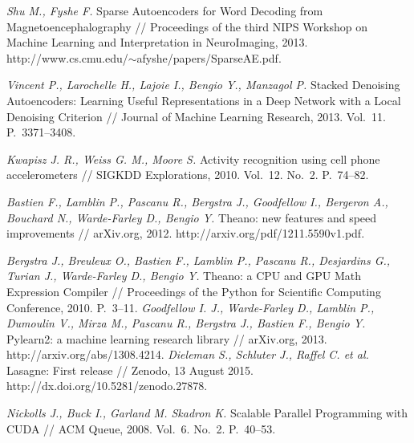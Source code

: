 \documentclass[12pt]{article}
\begin{document}
\begin{thebibliography}{10}
\emph{Shu M.,  Fyshe F.}
Sparse Autoencoders for Word Decoding from Magnetoencephalography // Proceedings of the third NIPS Workshop on Machine Learning and Interpretation in NeuroImaging,  2013. http://www.cs.cmu.edu/$\sim$afyshe/papers/SparseAE.pdf.

\emph{Vincent P., Larochelle H., Lajoie I., Bengio Y., Manzagol P.}
Stacked Denoising Autoencoders: Learning Useful Representations in
a Deep Network with a Local Denoising Criterion // Journal of Machine Learning Research, 2013. Vol.~11. P.~3371--3408.




\emph{Kwapisz J. R., Weiss G. M.,  Moore S.}
Activity recognition using cell phone accelerometers // SIGKDD Explorations, 2010. Vol.~12. No.~2. P.~74--82.

\emph{Bastien F., Lamblin P., Pascanu R., Bergstra J., Goodfellow I., Bergeron A., Bouchard N., Warde-Farley D.,  Bengio Y.}
Theano: new features and speed improvements // arXiv.org, 2012. http://arxiv.org/pdf/1211.5590v1.pdf.

\emph{Bergstra J., Breuleux O., Bastien F., Lamblin P., Pascanu R., Desjardins G., Turian J., Warde-Farley D., Bengio Y.}
Theano: a {CPU} and {GPU} Math Expression Compiler // Proceedings of the Python for Scientific Computing Conference, 2010. P.~3--11.
%
\emph{Goodfellow I. J.,  Warde-Farley D., Lamblin P., Dumoulin V., Mirza M., Pascanu R., Bergstra J., Bastien F., Bengio Y.}
Pylearn2: a machine learning research library // arXiv.org, 2013. http://arxiv.org/abs/1308.4214.
%
\emph{Dieleman S., Schluter J.,  Raffel C. et al.}
Lasagne: First release // Zenodo, 13 August 2015. http://dx.doi.org/10.5281/zenodo.27878.

\emph{Nickolls J.,  Buck I., Garland M. Skadron K.}
Scalable Parallel Programming with CUDA // ACM Queue, 2008. Vol.~6. No.~2. P.~40--53.


\end{thebibliography}
\end{document}
